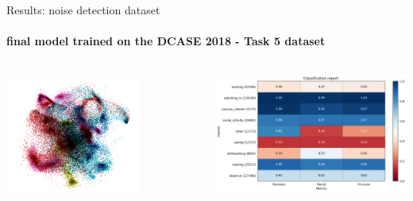 \documentclass[aspectratio=169, professionalfonts]{beamer}
\begin{document}
\begin{frame}{Results: noise detection dataset}
    \framesubtitle{final model trained on the DCASE 2018 - Task 5 dataset}
    
    \begin{columns}
        \centering
        \includegraphics[width=0.7\textwidth,keepaspectratio]{images/embedding_space_dcase.png}
        
        \centering
        \includegraphics[width=1.0\textwidth,keepaspectratio]{images/DCASE_F1_classification_report.png}
    \end{columns}
        

\end{frame}
\end{document}

